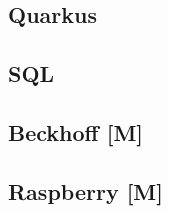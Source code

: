 \begin{spacing}{1}
    \section{Quarkus}\label{section:quarkus}
    \end{spacing}


\begin{spacing}{1}
    \section{SQL}\label{section:sql}
    \end{spacing}


\begin{spacing}{1}
    \section{Beckhoff [M]}\label{section:allTechBeckhoff}
    \end{spacing}

 
\begin{spacing}{1}
    \section{Raspberry [M]}\label{section:allTechRaspberry}
    \end{spacing}

 

